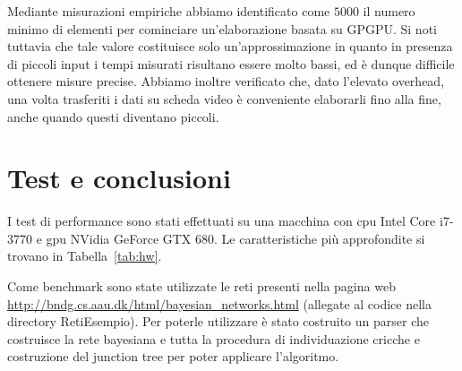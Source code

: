 \documentclass[a4paper]{article}   %
\begin{document}
Mediante misurazioni empiriche abbiamo identificato come $5000$ il numero minimo di elementi per cominciare un'elaborazione basata su GPGPU.
Si noti tuttavia che tale valore costituisce solo un'approssimazione in quanto in presenza di piccoli input i tempi misurati risultano essere molto bassi, ed è dunque difficile ottenere misure precise.
Abbiamo inoltre verificato che, dato l’elevato overhead, una volta trasferiti i dati su scheda video è conveniente elaborarli fino alla fine, anche quando questi diventano piccoli.



\section{Test e conclusioni}
I test di performance sono stati effettuati su una macchina con cpu Intel Core i7-3770 e gpu NVidia GeForce GTX 680. Le caratteristiche più approfondite si trovano in Tabella~\ref{tab:hw}.

Come benchmark sono state utilizzate le reti presenti nella pagina web \url{http://bndg.cs.aau.dk/html/bayesian_networks.html} (allegate al codice nella directory RetiEsempio).
Per poterle utilizzare è stato costruito un parser che costruisce la rete bayesiana e tutta la procedura di individuazione cricche e costruzione del junction tree per poter applicare l'algoritmo.
\end{document}
